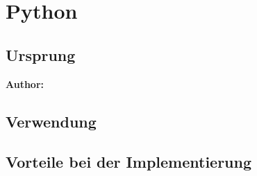 \chapter{Python}
\label{cha:Einleitung}



\section{Ursprung}

\textbf{Author:} 

\section{Verwendung}

\section{Vorteile bei der Implementierung}

